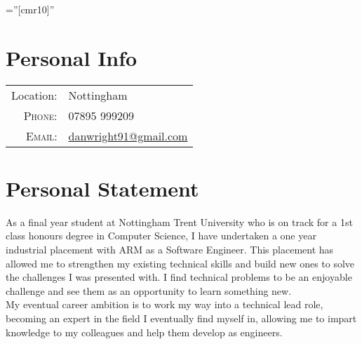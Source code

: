 \documentclass[a4paper,10pt]{article} %
\begin{document}
\pagestyle{empty} %

\font\fb=''[cmr10]'' %


\par{\bigskip\par} %

\section{Personal Info}

\begin{tabular}{rl}
Location: & Nottingham \\
\textsc{Phone:} & 07895 999209\\
\textsc{Email:} & \href{mailto:danwright91@gmail.com}{danwright91@gmail.com}
\end{tabular}


\section{Personal Statement}
As a final year student at Nottingham Trent University who is on track for a 1st class honours degree
in Computer Science, I have undertaken a one year industrial placement with ARM as a Software
Engineer. This placement has allowed me to strengthen my existing technical skills and build new
ones to solve the challenges I was presented with. I find technical problems to be an enjoyable
challenge and see them as an opportunity to learn something new. \\
My eventual career ambition is to work my way into a technical lead role, becoming an expert in the
field I eventually find myself in, allowing me to impart knowledge to my colleagues and help them
develop as engineers.

\end{document}
